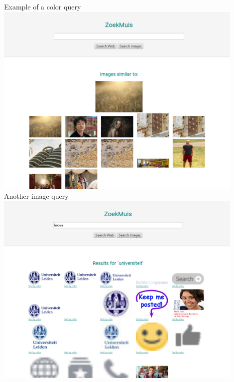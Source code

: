 \documentclass[10pt,a4paper]{article}
\begin{document}
\newpage
Example of a color query\newline
\includegraphics[width=12cm]{zoekmuis_color.png}\newline
Another image query\newline
\includegraphics[width=12cm]{zoekmuis_images2.png}\newline
\end{document}
